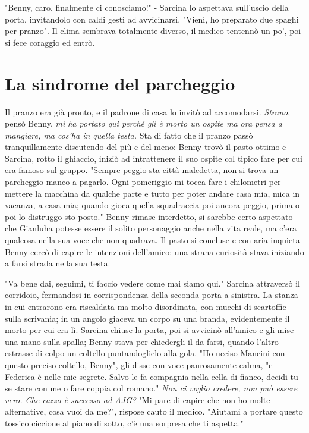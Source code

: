 "Benny, caro, finalmente ci conosciamo!" - Sarcina lo aspettava sull'uscio della porta, invitandolo con caldi gesti ad avvicinarsi.
"Vieni, ho preparato due spaghi per pranzo".
Il clima sembrava totalmente diverso, il medico tentennò un po', poi si fece coraggio ed entrò.

\section{La sindrome del parcheggio}

Il pranzo era già pronto, e il padrone di casa lo invitò ad accomodarsi.
\textit{Strano}, pensò Benny, \textit{mi ha portato qui perché gli è morto un ospite ma ora pensa a mangiare, ma cos'ha in quella testa.}
Sta di fatto che il pranzo passò tranquillamente discutendo del più e del meno: Benny trovò il pasto ottimo e Sarcina, rotto il ghiaccio, iniziò ad intrattenere il suo ospite col tipico fare per cui era famoso sul gruppo.
"Sempre peggio sta città maledetta, non si trova un parcheggio manco a pagarlo. Ogni pomeriggio mi tocca fare i chilometri per mettere la macchina da qualche parte e tutto per poter andare casa mia, mica in vacanza, a casa mia; quando gioca quella squadraccia poi ancora peggio, prima o poi lo distruggo sto posto."
Benny rimase interdetto, si sarebbe certo aspettato che Gianluha potesse essere il solito personaggio anche nella vita reale, ma c'era qualcosa nella sua voce che non quadrava.
Il pasto si concluse e con aria inquieta Benny cercò di capire le intenzioni dell'amico: una strana curiosità stava iniziando a farsi strada nella sua testa.

"Va bene dai, seguimi, ti faccio vedere come mai siamo qui."
Sarcina attraversò il corridoio, fermandosi in corrispondenza della seconda porta a sinistra. 
La stanza in cui entrarono era riscaldata ma molto disordinata, con mucchi di scartoffie sulla scrivania; in un angolo giaceva un corpo su una branda, evidentemente il morto per cui era lì.
Sarcina chiuse la porta, poi si avvicinò all'amico e gli mise una mano sulla spalla; Benny stava per chiedergli il da farsi, quando l'altro estrasse di colpo un coltello puntandoglielo alla gola.
"Ho ucciso Mancini con questo preciso coltello, Benny", gli disse con voce paurosamente calma, "e Federica è nelle mie segrete. Salvo le fa compagnia nella cella di fianco, decidi tu se stare con me o fare coppia col romano."
\textit{Non ci voglio credere, non può essere vero. Che cazzo è successo ad AJG?}
"Mi pare di capire che non ho molte alternative, cosa vuoi da me?", rispose cauto il medico.
"Aiutami a portare questo tossico ciccione al piano di sotto, c'è una sorpresa che ti aspetta."

